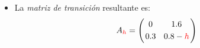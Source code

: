 \begin{frame}
\begin{itemize}
		\vspace{1mm}
		\item La \textit{matriz de transición} resultante es:
		\[	
		A_{\color{red}h} =
		\left(
		\begin{array}{@{\hspace{0.2\tabcolsep}}c@{\hspace{1.6\tabcolsep}}c@{\hspace{0.2\tabcolsep}}}
		0 & 1.6 \\[1mm]
		0.3 & 0.8-{\color{red}h}
		\end{array}
		\right)		
		\]
	\end{itemize}
	
\end{frame}


\subsection{}

